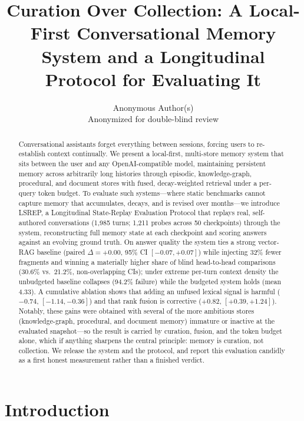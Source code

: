\documentclass[10pt]{article}
\title{Curation Over Collection: A Local-First Conversational Memory System and a Longitudinal Protocol for Evaluating It}
\author{\name Anonymous Author(s) \\ \addr Anonymized for double-blind review}
\begin{document}
\maketitle

\begin{abstract}
Conversational assistants forget everything between sessions, forcing users to re-establish context continually. We present a local-first, multi-store memory system that sits between the user and any OpenAI-compatible model, maintaining persistent memory across arbitrarily long histories through episodic, knowledge-graph, procedural, and document stores with fused, decay-weighted retrieval under a per-query token budget. To evaluate such systems---where static benchmarks cannot capture memory that accumulates, decays, and is revised over months---we introduce LSREP, a Longitudinal State-Replay Evaluation Protocol that replays real, self-authored conversations (1{,}985 turns; 1{,}211 probes across 50 checkpoints) through the system, reconstructing full memory state at each checkpoint and scoring answers against an evolving ground truth. On answer quality the system ties a strong vector-RAG baseline (paired $\Delta = +0.00$, 95\% CI $[-0.07, +0.07]$) while injecting 32\% fewer fragments and winning a materially higher share of blind head-to-head comparisons (30.6\% vs.\ 21.2\%, non-overlapping CIs); under extreme per-turn context density the unbudgeted baseline collapses (94.2\% failure) while the budgeted system holds (mean 4.33). A cumulative ablation shows that adding an unfused lexical signal is harmful ($-0.74$, $[-1.14, -0.36]$) and that rank fusion is corrective ($+0.82$, $[+0.39, +1.24]$). Notably, these gains were obtained with several of the more ambitious stores (knowledge-graph, procedural, and document memory) immature or inactive at the evaluated snapshot---so the result is carried by curation, fusion, and the token budget alone, which if anything sharpens the central principle: memory is curation, not collection. We release the system and the protocol, and report this evaluation candidly as a first honest measurement rather than a finished verdict.
\end{abstract}

\section{Introduction}
\end{document}
